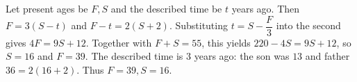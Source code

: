 Let present ages be $F,S$ and the described time be $t$ years ago. Then $F=3(S-t)$ and $F-t=2(S+2)$. Substituting $t=S-\dfrac{F}{3}$ into the second gives $4F=9S+12$. Together with $F+S=55$, this yields $220-4S=9S+12$, so $S=16$ and $F=39$. The described time is $3$ years ago: the son was $13$ and father $36=2(16+2)$. Thus $\boxed{F=39,S=16}$.
